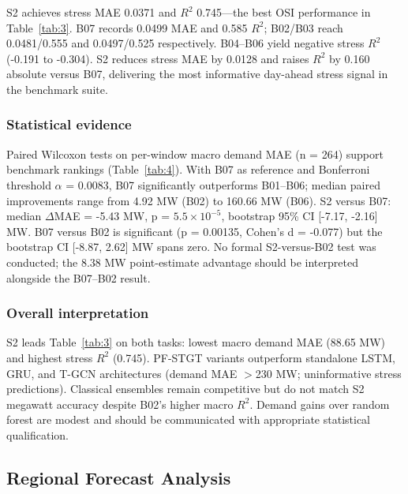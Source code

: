S2 achieves stress MAE 0.0371 and $R^2$ 0.745---the best OSI performance in Table~\ref{tab:3}. B07 records 0.0499 MAE and 0.585 $R^2$; B02/B03 reach 0.0481/0.555 and 0.0497/0.525 respectively. B04--B06 yield negative stress $R^2$ (-0.191 to -0.304). S2 reduces stress MAE by 0.0128 and raises $R^2$ by 0.160 absolute versus B07, delivering the most informative day-ahead stress signal in the benchmark suite.

\subsubsection{Statistical evidence}\label{subsubsection:statistical_evidence}

Paired Wilcoxon tests \cite{Wilcoxon1945SignedRank} on per-window macro demand MAE (n = 264) support benchmark rankings (Table~\ref{tab:4}). With B07 as reference and Bonferroni threshold \cite{Dunn1961Bonferroni} $\alpha$ = 0.0083, B07 significantly outperforms B01--B06; median paired improvements range from 4.92 MW (B02) to 160.66 MW (B06). S2 versus B07: median $\Delta$MAE = -5.43 MW, p = $5.5 \times 10^{-5}$, bootstrap 95\% CI \cite{Efron1993Bootstrap} [-7.17, -2.16] MW. B07 versus B02 is significant (p = 0.00135, Cohen's d \cite{Cohen1988StatisticalPower} = -0.077) but the bootstrap CI [-8.87, 2.62] MW spans zero. No formal S2-versus-B02 test was conducted; the 8.38 MW point-estimate advantage should be interpreted alongside the B07--B02 result.

\subsubsection{Overall interpretation}\label{subsubsection:overall_interpretation}

S2 leads Table~\ref{tab:3} on both tasks: lowest macro demand MAE (88.65 MW) and highest stress $R^2$ (0.745). PF-STGT variants outperform standalone LSTM, GRU, and T-GCN architectures (demand MAE $>$230 MW; uninformative stress predictions). Classical ensembles remain competitive but do not match S2 megawatt accuracy despite B02's higher macro $R^2$. Demand gains over random forest are modest and should be communicated with appropriate statistical qualification.

\subsection{Regional Forecast Analysis}\label{subsection:regional_forecast_analysis}

